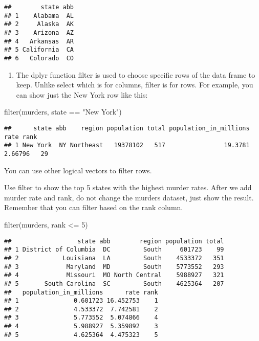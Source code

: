\documentclass[
]{article}
\newenvironment{Shaded}{\begin{snugshade}}{\end{snugshade}}
\newcommand{\DecValTok}[1]{\textcolor[rgb]{0.00,0.00,0.81}{#1}}
\newcommand{\FunctionTok}[1]{\textcolor[rgb]{0.00,0.00,0.00}{#1}}
\newcommand{\NormalTok}[1]{#1}
\newcommand{\SpecialCharTok}[1]{\textcolor[rgb]{0.00,0.00,0.00}{#1}}
\newcommand{\StringTok}[1]{\textcolor[rgb]{0.31,0.60,0.02}{#1}}
\providecommand{\tightlist}{%
  \setlength{\itemsep}{0pt}\setlength{\parskip}{0pt}}
\begin{document}
\begin{verbatim}
##        state abb
## 1    Alabama  AL
## 2     Alaska  AK
## 3    Arizona  AZ
## 4   Arkansas  AR
## 5 California  CA
## 6   Colorado  CO
\end{verbatim}

\begin{enumerate}
\def\labelenumi{\arabic{enumi}.}
\setcounter{enumi}{3}
\tightlist
\item
  The dplyr function filter is used to choose specific rows of the data
  frame to keep. Unlike select which is for columns, filter is for rows.
  For example, you can show just the New York row like this:
\end{enumerate}

\begin{Shaded}
\begin{Highlighting}[]
\FunctionTok{filter}\NormalTok{(murders, state }\SpecialCharTok{==} \StringTok{"New York"}\NormalTok{)}
\end{Highlighting}
\end{Shaded}

\begin{verbatim}
##      state abb    region population total population_in_millions    rate rank
## 1 New York  NY Northeast   19378102   517                19.3781 2.66796   29
\end{verbatim}

You can use other logical vectors to filter rows.

Use filter to show the top 5 states with the highest murder rates. After
we add murder rate and rank, do not change the murders dataset, just
show the result. Remember that you can filter based on the rank column.

\begin{Shaded}
\begin{Highlighting}[]
\FunctionTok{filter}\NormalTok{(murders, rank }\SpecialCharTok{\textless{}=} \DecValTok{5}\NormalTok{)}
\end{Highlighting}
\end{Shaded}

\begin{verbatim}
##                  state abb        region population total
## 1 District of Columbia  DC         South     601723    99
## 2            Louisiana  LA         South    4533372   351
## 3             Maryland  MD         South    5773552   293
## 4             Missouri  MO North Central    5988927   321
## 5       South Carolina  SC         South    4625364   207
##   population_in_millions      rate rank
## 1               0.601723 16.452753    1
## 2               4.533372  7.742581    2
## 3               5.773552  5.074866    4
## 4               5.988927  5.359892    3
## 5               4.625364  4.475323    5
\end{verbatim}
\end{document}
